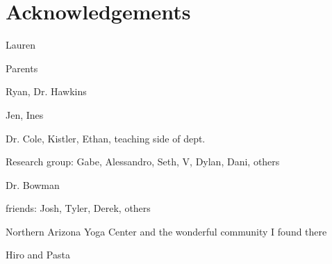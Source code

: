 \chapter*{Acknowledgements}
{}


Lauren

Parents

Ryan, Dr. Hawkins

Jen, Ines

Dr. Cole, Kistler, Ethan, teaching side of dept.

Research group: Gabe, Alessandro, Seth, V, Dylan, Dani, others

Dr. Bowman

friends: Josh, Tyler, Derek, others

Northern Arizona Yoga Center and the wonderful community I found there

Hiro and Pasta
